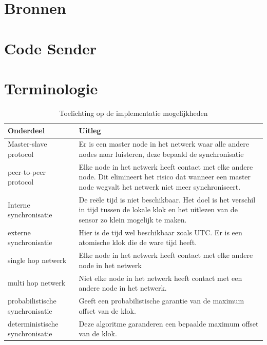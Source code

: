 \documentclass{article}
\begin{document}
\section{Bronnen}
\newpage
\appendix
\section{Code Sender}

\newpage
\section{Terminologie}
\label{Terminologie}
\begin{table}
	\centering\caption{Toelichting op de implementatie mogelijkheden}
	\label{tab: implmentatie_mogelijkheden}
    \begin{tabular}{  l | p{5cm} }
    
    \textbf{Onderdeel} & \textbf{Uitleg} \\ \hline\hline
    Master-slave protocol & Er is een master node in het netwerk waar alle andere nodes naar luisteren, deze bepaald de synchronisatie \\ \hline
    peer-to-peer protocol &  Elke node in het netwerk heeft contact met elke andere node. Dit elimineert het risico dat wanneer een master node wegvalt het netwerk niet meer synchroniseert.\\ \hline
    Interne synchronisatie & De re\"{e}le tijd is niet beschikbaar. Het doel is het verschil in tijd tussen de lokale klok en het uitlezen van de sensor zo klein mogelijk te maken.\\
    \hline
    externe synchronisatie & Hier is de tijd wel beschikbaar zoals UTC. Er is een atomische klok die de ware tijd heeft.\\
    \hline
    single hop netwerk & Elke node in het netwerk heeft contact met elke andere node in het netwerk\\
    \hline
    multi hop netwerk & Niet elke node in het netwerk heeft contact met een andere node in het netwerk. \\
    \hline
    probabilistische synchronisatie & Geeft een probabilistische garantie van de maximum offset van de klok. \\
    \hline
    deterministische synchronisatie & Deze algoritme garanderen een bepaalde maximum offset van de klok. \\
    
    \end{tabular}
\end{table}
\end{document}
